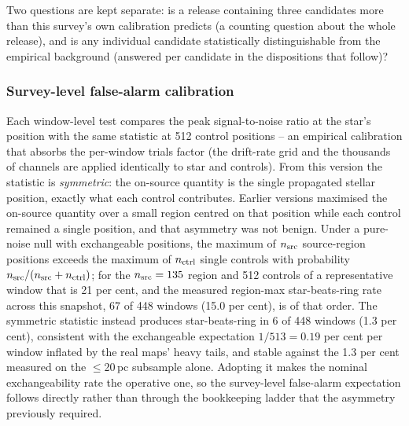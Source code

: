 \documentclass{openjournal}
\begin{document}
Two questions are kept separate: is a release containing three
candidates more than this survey's own calibration predicts (a
counting question about the whole release), and is any individual
candidate statistically distinguishable from the empirical background
(answered per candidate in the dispositions that follow)?

\subsubsection*{Survey-level false-alarm calibration}

Each window-level test compares the peak signal-to-noise ratio at the
star's position with the same statistic at 512 control positions --
an empirical calibration that absorbs the per-window trials factor
(the drift-rate grid and the thousands of channels are applied
identically to star and controls). From this version the statistic is
\emph{symmetric}: the on-source quantity is the single propagated
stellar position, exactly what each control contributes. Earlier
versions maximised the on-source quantity over a small region centred
on that position while each control remained a single position, and
that asymmetry was not benign. Under a pure-noise null with
exchangeable positions, the maximum of $n_{\rm src}$ source-region
positions exceeds the maximum of $n_{\rm ctrl}$ single controls with
probability $n_{\rm src}/(n_{\rm src}+n_{\rm ctrl})$; for the
$n_{\rm src}=135$ region and 512 controls of a representative window
that is 21 per cent, and the measured region-max star-beats-ring rate
across this snapshot, 67 of 448 windows (15.0 per cent), is of that
order. The symmetric statistic instead produces star-beats-ring in 6
of 448 windows (1.3 per cent), consistent with the exchangeable
expectation $1/513=0.19$ per cent per window inflated by the real
maps' heavy tails, and stable against the 1.3 per cent measured on the
$\le$20\,pc subsample alone. Adopting it makes the nominal
exchangeability rate the operative one, so the survey-level
false-alarm expectation follows directly rather than through the
bookkeeping ladder that the asymmetry previously required.
\end{document}
